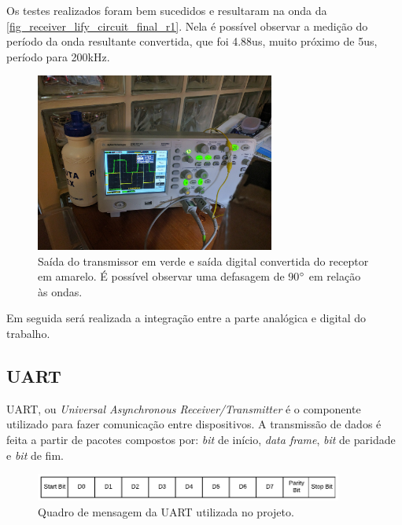 	Os testes realizados foram bem sucedidos e resultaram na onda da \autoref{fig_receiver_lify_circuit_final_r1}. Nela é possível observar a medição do período da onda resultante convertida, que foi 4.88us, muito próximo de 5us, período para 200kHz.
	
	\begin{figure}[htb]
		\caption{\label{fig_receiver_lify_circuit_final_r1}Saída do transmissor em verde e saída digital convertida do receptor em amarelo. É possível observar uma defasagem de 90$\degree$ em relação às ondas.}
		\centering
		\includegraphics[width=0.7\textwidth, trim={36cm 30cm 60cm 40cm}, clip]{circuits/photos/TXRX_final_fixed.jpg}
	\end{figure}
	
	Em seguida será realizada a integração entre a parte analógica e digital do trabalho.
	
	\subsection{UART}
	
	UART, ou \textit{Universal Asynchronous Receiver/Transmitter} é o componente utilizado para fazer comunicação entre dispositivos. A transmissão de dados é feita a partir de pacotes compostos por: \textit{bit} de início, \textit{data frame}, \textit{bit} de paridade e \textit{bit} de fim.
	\begin{figure}[h]
		\caption{\label{figure:uart-frame}Quadro de mensagem da UART utilizada no projeto.}
		\centering
		\includegraphics[width=0.9\textwidth]{uart/frame.pdf}
	\end{figure}
	
